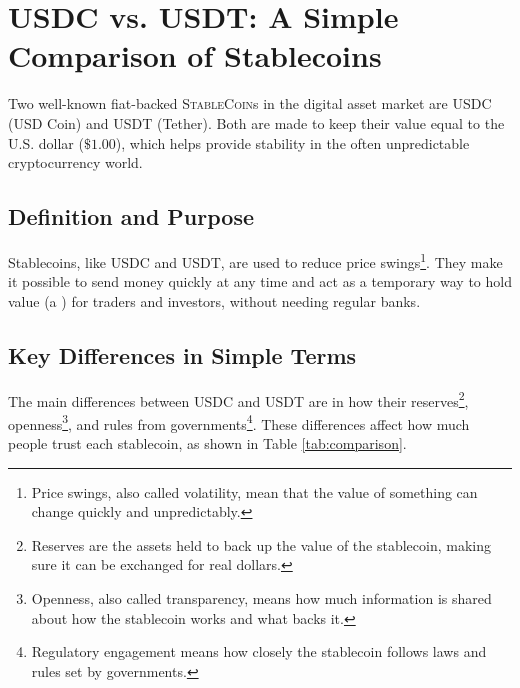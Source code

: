 \documentclass{article}
\newcommand{\stablecoin}{\textsc{StableCoin}}
\begin{document}
\section*{USDC vs. USDT: A Simple Comparison of Stablecoins}

\noindent Two well-known fiat-backed \stablecoin s in the digital asset market are USDC (USD Coin) and USDT (Tether). Both are made to keep their value equal to the U.S. dollar ($\$1.00$), which helps provide stability in the often unpredictable cryptocurrency world.

\subsection*{Definition and Purpose}

\noindent Stablecoins, like USDC and USDT, are used to reduce price 
swings\footnote{Price swings, also called volatility, mean that the 
value of something can change quickly and unpredictably.}. They make 
it possible to send money quickly at any time and act as a temporary 
way to hold value (a ) 
for traders and investors, without needing regular banks.

\subsection*{Key Differences in Simple Terms}

\noindent The main differences between USDC and USDT are in how their 
reserves\footnote{Reserves are the assets held to back up the value of 
the stablecoin, making sure it can be exchanged for real dollars.}, 
openness\footnote{Openness, also called transparency, means how much 
information is shared about how the stablecoin works and what backs it.}, 
and rules from governments\footnote{Regulatory engagement means how 
closely the stablecoin follows laws and rules set by governments.}. 
These differences affect how much people trust each stablecoin, as 
shown in Table \ref{tab:comparison}.
\end{document}
